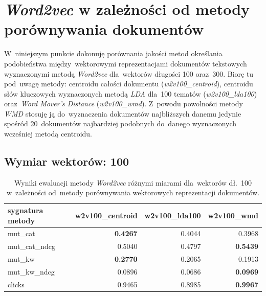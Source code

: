 \documentclass[pl]{minipw} %
\begin{document}
\section{\textit{Word2vec} w zależności od metody porównywania dokumentów}

W~niniejszym punkcie dokonuję porównania jakości metod określania podobieństwa między~wektorowymi reprezentacjami dokumentów tekstowych wyznaczonymi metodą \textit{Word2vec} dla~wektorów długości 100 oraz~300. Biorę tu pod~uwagę metody: centroidu całości dokumentu (\textit{w2v100\_centroid}), centroidu słów kluczowych wyznaczonych metodą \textit{LDA} dla~100 tematów (\textit{w2v100\_lda100}) oraz~\textit{Word Mover's Distance} (\textit{w2v100\_wmd}). Z~powodu powolności metody \textit{WMD} stosuję ją do~wyznaczenia dokumentów najbliższych danemu jedynie spośród 20~dokumentów najbardziej podobnych do~danego wyznaczonych wcześniej metodą centroidu.

\subsection{Wymiar wektorów: 100}

\begin{table}[H]
	\centering
	\begin{tabular}{lrrr}
		\hline
		sygnatura metody &   w2v100\_centroid &   w2v100\_lda100 &   w2v100\_wmd \\
		\hline
		mut\_cat      &            \textbf{0.4267} &          0.4044 &       0.3968 \\
		mut\_cat\_ndcg &            0.5040  &          0.4797 &       \textbf{0.5439} \\
		mut\_kw       &            \textbf{0.2770}  &          0.2065 &       0.1913 \\
		mut\_kw\_ndcg  &            0.0896 &          0.0686 &       \textbf{0.0969} \\
		clicks       &            0.9465 &          0.8985 &       \textbf{0.9967} \\
		\hline
	\end{tabular}
	\caption{Wyniki ewaluacji metody \textit{Word2vec} różnymi miarami dla~wektorów dł.~100 w~zależności od~metody porównywania wektorowych reprezentacji dokumentów.}
\end{table}
\end{document}
